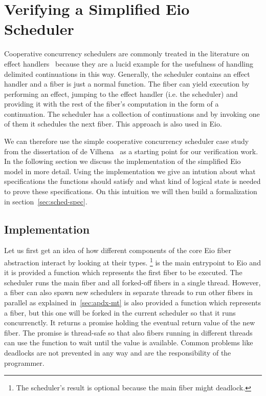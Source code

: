 \section{Verifying a Simplified Eio Scheduler}
\label{sec:scheduler}


Cooperative concurrency schedulers are commonly treated in the literature on effect handlers~\cite{dolan2018concurrent,leijen2017structured,de2021separation} because they are a lucid example for the usefulness of handling delimited continuations in this way.
Generally, the scheduler contains an effect handler and a fiber is just a normal function.
The fiber can yield execution by performing an effect, jumping to the effect handler (i.e. the scheduler) and providing it with the rest of the fiber's computation in the form of a continuation.
The scheduler has a collection of continuations and by invoking one of them it schedules the next fiber.
This approach is also used in Eio.

We can therefore use the simple cooperative concurrency scheduler case study from the dissertation of de Vilhena~\cite{de2022proof} as a starting point for our verification work.
In the following section we discuss the implementation of the simplified Eio model in more detail.
Using the implementation we give an intution about what specifications the functions should satisfy and what kind of logical state is needed to prove these specifications.
On this intuition we will then build a formalization in section~\ref{sec:sched-spec}.

\subsection{Implementation}
\label{sec:sched-impl}

Let us first get an idea of how different components of the core Eio fiber abstraction interact by looking at their types.
\footnote{The scheduler's result is optional because the main fiber might deadlock.} is the main entrypoint to Eio and it is provided a function which represents the first fiber to be executed.
The scheduler runs the main fiber and all forked-off fibers in a single thread.
However, a fiber can also spawn new schedulers in separate threads to run other fibers in parallel as explained in~\ref{sec:apdx-mt}
 is also provided a function which represents a fiber, but this one will be forked in the current scheduler so that it runs concurrenctly.
It returns a promise holding the eventual return value of the new fiber.
The promise is thread-safe so that also fibers running in different threads can use the  function to wait until the value is available.
Common problems like deadlocks are not prevented in any way and are the responsibility of the programmer.


